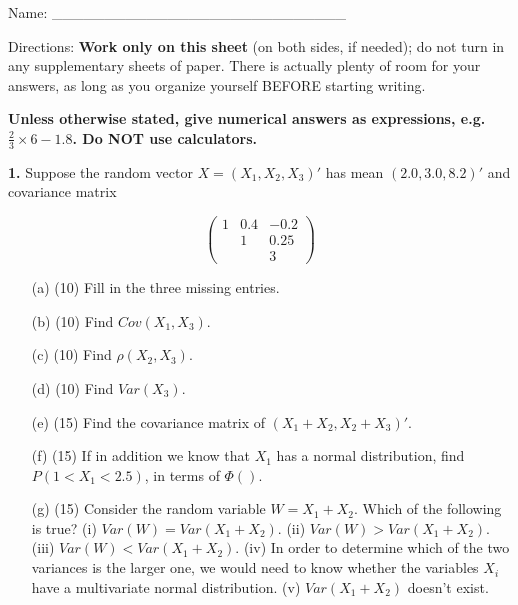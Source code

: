 \documentclass[twocolumn]{article}
\begin{document}
Name: \_\_\_\_\_\_\_\_\_\_\_\_\_\_\_\_\_\_\_\_\_\_\_\_\_\_\_\_

Directions: {\bf \Large Work only on this sheet} (on both sides, if
needed); do not turn in any supplementary sheets of paper. There is
actually plenty of room for your answers, as long as you organize
yourself BEFORE starting writing.

{\bf \Large Unless otherwise stated, give numerical answers as
expressions, e.g. $\frac{2}{3} \times 6 - 1.8$.  Do NOT use
calculators.}

{\bf 1.} Suppose the random vector $X = (X_1,X_2,X_3)'$ has mean
$(2.0,3.0,8.2)'$ and covariance matrix

\begin{equation}
   \left (
   \begin{array}{ccc}
   1 & 0.4 & -0.2\\
   \  & 1 &  0.25 \\
   \  & \  & 3
   \end{array}
   \right )     
\end{equation}

\begin{itemize}

\item [(a)] (10) Fill in the three missing entries.

\item [(b)] (10) Find $Cov(X_1,X_3)$.

\item [(c)] (10) Find $\rho(X_2,X_3)$.

\item [(d)] (10) Find $Var(X_3)$.

\item [(e)] (15) Find the covariance matrix of $(X_1+X_2,X_2+X_3)'$.

\item [(f)] (15) If in addition we know that $X_1$ has a normal
distribution, find $P(1 < X_1 < 2.5)$, in terms of $\Phi()$.

\item [(g)] (15) Consider the random variable $W = X_1 + X_2$.  Which of
the following is true?
(i) $Var(W) = Var(X_1+X_2)$.
(ii) $Var(W) > Var(X_1+X_2)$.
(iii) $Var(W) < Var(X_1+X_2)$.
(iv) In order to determine which of the two variances is the larger one,
we would need to know whether the variables $X_i$ have a multivariate
normal distribution.
(v) $Var(X_1+X_2)$ doesn't exist.

\end{itemize}
\end{document}
